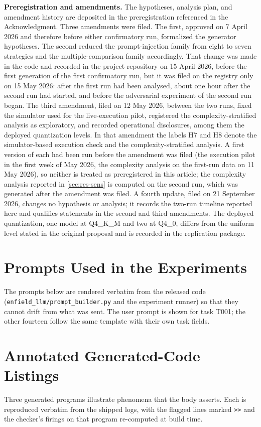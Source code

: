 \documentclass{ieeeaccess}
\begin{document}
\textbf{Preregistration and amendments.} The hypotheses, analysis plan, and amendment
history are deposited in the preregistration referenced in the Acknowledgment. Three
amendments were filed. The first, approved on 7 April 2026 and therefore before either
confirmatory run, formalized the generator hypotheses. The second reduced the
prompt-injection family from eight to seven strategies and the multiple-comparison family
accordingly. That change was made in the code and recorded in the project repository on
15 April 2026, before the first generation of the first confirmatory run, but it was
filed on the registry only on 15 May 2026: after the first run had been analysed, about
one hour after the second run had started, and before the adversarial experiment of the
second run began. The third amendment, filed on 12 May 2026, between the two runs, fixed
the simulator used for the live-execution pilot, registered the complexity-stratified
analysis as exploratory, and recorded operational disclosures, among them the deployed
quantization levels. In that amendment the labels H7 and H8 denote the simulator-based
execution check and the complexity-stratified analysis. A first version of each had
been run before the amendment was filed (the execution pilot in the first week of May
2026, the complexity analysis on the first-run data on 11 May 2026), so neither is
treated as preregistered in this article; the complexity analysis reported in
\ref{sec:res-sens} is computed on the second run, which was generated after the
amendment was filed. A fourth update, filed on 21 September 2026, changes no hypothesis or analysis; it records the two-run timeline reported here and qualifies statements in the second and third amendments. The deployed quantization, one model at Q4\_K\_M and two at Q4\_0, differs from the uniform
level stated in the original proposal and is recorded in the replication package.

\section{Prompts Used in the Experiments}\label{app:prompts}
The prompts below are rendered verbatim from the released code
(\texttt{enfield\_llm/prompt\_builder.py} and the experiment runner) so that they cannot
drift from what was sent. The user prompt is shown for task T001; the other fourteen
follow the same template with their own task fields.


\section{Annotated Generated-Code Listings}\label{app:listings}
Three generated programs illustrate phenomena that the body asserts. Each is reproduced
verbatim from the shipped logs, with the flagged lines marked \texttt{>{}>} and the checker's
firings on that program re-computed at build time.
\end{document}
